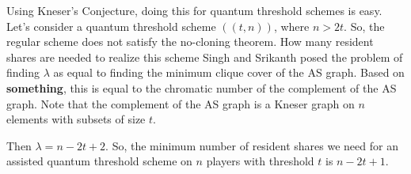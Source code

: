 Using Kneser's Conjecture, doing this for quantum threshold schemes is easy. Let's consider a quantum threshold scheme $((t,n))$, where $n > 2t$. So, the regular scheme does not satisfy the no-cloning theorem. How many resident shares are needed to realize this scheme Singh and Srikanth posed the problem of finding $\lambda$ as equal to finding the minimum clique cover of the AS graph. Based on \textbf{something}, this is equal to the chromatic number of the complement of the AS graph. Note that the complement of the AS graph is a Kneser graph on $n$ elements with subsets of size $t$.

Then $\lambda = n-2t+2$. So, the minimum number of resident shares we need for an assisted quantum threshold scheme on $n$ players with threshold $t$ is $n-2t+1$.